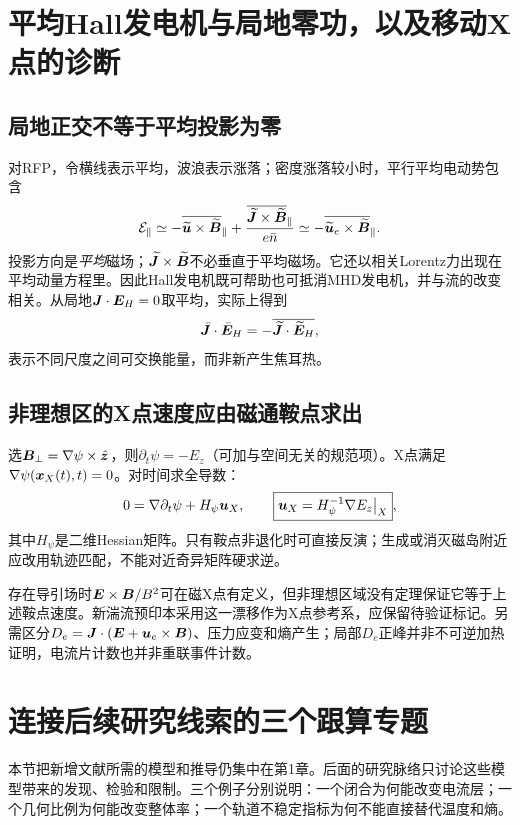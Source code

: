 \documentclass[UTF8,a4paper,11pt,openany,fontset=fandol]{ctexbook}
\begin{document}
\section{平均Hall发电机与局地零功，以及移动X点的诊断}
\subsection{局地正交不等于平均投影为零}
对RFP，令横线表示平均，波浪表示涨落；密度涨落较小时，平行平均电动势包含
\begin{equation}
 \mathcal E_\parallel\simeq
 -\overline{\widetilde{\bm{u}}\times\widetilde{\bm{B}}}_\parallel
 +{\overline{\widetilde{\bm{J}}\times\widetilde{\bm{B}}}_\parallel\over e\bar n}
 \simeq-\overline{\widetilde{\bm{u}}_e\times\widetilde{\bm{B}}}_\parallel.
\end{equation}
投影方向是\emph{平均}磁场；$\widetilde{\bm{J}}\times\widetilde{\bm{B}}$不必垂直于平均磁场。它还以相关Lorentz力出现在平均动量方程里。因此Hall发电机既可帮助也可抵消MHD发电机，并与流的改变相关\citep{F798}。从局地$\bm{J}\cdot\bm{E}_H=0$取平均，实际上得到
\begin{equation}
 \bar{\bm{J}}\cdot\bar{\bm{E}}_H=-\overline{\widetilde{\bm{J}}\cdot\widetilde{\bm{E}}_H},
\end{equation}
表示不同尺度之间可交换能量，而非新产生焦耳热。

\subsection{非理想区的X点速度应由磁通鞍点求出}
选$\bm{B}_\perp=\nabla\psi\times\hat{\bm{z}}$，则$\partial_t\psi=-E_z$（可加与空间无关的规范项）。X点满足$\nabla\psi(\bm{x}_X(t),t)=0$。对时间求全导数：
\begin{equation}
 0=\nabla\partial_t\psi+H_\psi\bm{u}_X,
 \qquad\boxed{\bm{u}_X=H_\psi^{-1}\nabla E_z\big|_X},
\end{equation}
其中$H_\psi$是二维Hessian矩阵。只有鞍点非退化时可直接反演；生成或消灭磁岛附近应改用轨迹匹配，不能对近奇异矩阵硬求逆。

存在导引场时$\bm{E}\times\bm{B}/B^2$可在磁X点有定义，但非理想区域没有定理保证它等于上述鞍点速度。新湍流预印本采用这一漂移作为X点参考系\citep{F655}，应保留待验证标记。另需区分$D_e=\bm{J}\cdot(\bm{E}+\bm{u}_e\times\bm{B})$、压力应变和熵产生；局部$D_e$正峰并非不可逆加热证明，电流片计数也并非重联事件计数。


\section{连接后续研究线索的三个跟算专题}
本节把新增文献所需的模型和推导仍集中在第1章。后面的研究脉络只讨论这些模型带来的发现、检验和限制。三个例子分别说明：一个闭合为何能改变电流层；一个几何比例为何能改变整体率；一个轨道不稳定指标为何不能直接替代温度和熵。
\end{document}
